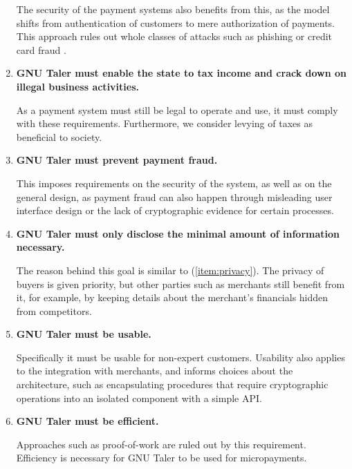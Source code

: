 \begin{enumerate}
    The security of the payment systems also benefits from this, as the model
    shifts from authentication of customers to mere authorization of payments.
    This approach rules out whole classes of attacks such as phishing \cite{garera2007framework} or credit
    card fraud \cite{sahin2010overview}.

  \item \textbf{GNU Taler must enable the state to tax income and crack down on
    illegal business activities.}

    As a payment system must still be legal to operate and use, it must comply
    with these requirements.  Furthermore, we consider levying of taxes as
    beneficial to society.

  \item \textbf{GNU Taler must prevent payment fraud.}

    This imposes requirements on the security of the system, as well as on the
    general design, as payment fraud can also happen through misleading user
    interface design or the lack of cryptographic evidence for certain
    processes.

  \item \textbf{GNU Taler must only disclose the minimal amount of information
    necessary.}

    The reason behind this goal is similar to (\ref{item:privacy}).  The
    privacy of buyers is given priority, but other parties such as merchants
    still benefit from it, for example, by keeping details about the merchant's financials
    hidden from competitors.


  \item \textbf{GNU Taler must be usable.}

    Specifically it must be usable for non-expert customers.  Usability also
    applies to the integration with merchants, and informs choices about the
    architecture, such as encapsulating procedures that require cryptographic
    operations into an isolated component with a simple API.

  \item \textbf{GNU Taler must be efficient.}

    Approaches such as proof-of-work are ruled out by this requirement.  Efficiency is
    necessary for GNU Taler to be used for micropayments.


\end{enumerate}
